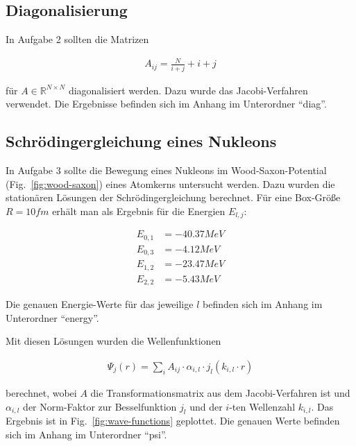 \subsection{Diagonalisierung}
\label{sec:diag}

In Aufgabe 2 sollten die Matrizen

\begin{align}
  A_{ij} = \frac{N}{i+j} + i +j
\end{align}

für $A \in \mathbb{R}^{N \times N}$ diagonalisiert werden. Dazu wurde
das Jacobi-Verfahren verwendet. Die Ergebnisse befinden sich im Anhang
im Unterordner ``diag''.

\subsection{Schrödingergleichung eines Nukleons}
\label{sec:sgl-nukleon}

In Aufgabe 3 sollte die Bewegung eines Nukleons im
Wood-Saxon-Potential (Fig.~\ref{fig:wood-saxon}) eines Atomkerns
untersucht werden. Dazu wurden die stationären Lösungen der
Schrödingergleichung berechnet. Für eine Box-Größe $R = \unit{10}{fm}$
erhält man als Ergebnis für die Energien $E_{l,j}$:

\begin{align}
  E_{0,1} &= \unit{-40.37}{MeV} \\
  E_{0,3} &= \unit{-4.12}{MeV} \\
  E_{1,2} &= \unit{-23.47}{MeV} \\
  E_{2,2} &= \unit{-5.43}{MeV}
\end{align}

Die genauen Energie-Werte für das jeweilige $l$ befinden sich im
Anhang im Unterordner ``energy''.

Mit diesen Lösungen wurden die Wellenfunktionen

\begin{align}
  \varPsi_j(r) = \sum_i A_{ij} \cdot \alpha_{i,l} \cdot j_l(k_{i,l} \cdot r)
\end{align}

berechnet, wobei $A$ die Transformationsmatrix aus dem
Jacobi-Verfahren ist und $\alpha_{i,l}$ der Norm-Faktor zur
Besselfunktion $j_l$ und der $i$-ten Wellenzahl $k_{i,l}$. Das
Ergebnis ist in Fig.~\ref{fig:wave-functions} geplottet. Die genauen
Werte befinden sich im Anhang im Unterordner ``psi''.

